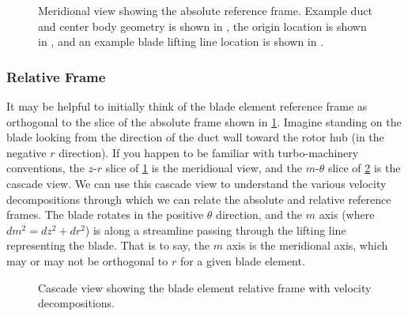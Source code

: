 %    

\begin{figure}[h!]
    \centering
   
   \caption{Meridional view showing the absolute reference frame. Example duct and center body geometry is shown in , the origin location is shown in , and an example blade lifting line location is shown in .}
    \label{fig:absolutecoordinatesystem}
\end{figure}



\subsubsection{Relative Frame}
\label{ssec:relativeframe}

It may be helpful to initially think of the blade element reference frame as orthogonal to the slice of the absolute frame shown in \cref{fig:absolutecoordinatesystem}.
%
Imagine standing on the blade looking from the direction of the duct wall toward the rotor hub (in the negative \(r\) direction).
%
If you happen to be familiar with turbo-machinery conventions, the \(z\)-\(r\) slice of \cref{fig:absolutecoordinatesystem} is the meridional view, and the \(m\)-\(\theta\) slice of \cref{fig:relativeframe} is the cascade view.
%
We can use this cascade view to understand the various velocity decompositions through which we can relate the absolute and relative reference frames.
%
The blade rotates in the positive \(\theta\) direction, and the \(m\) axis (where \(dm^2 = dz^2+dr^2\)) is along a streamline passing through the lifting line representing the blade.
%
That is to say, the \(m\) axis is the meridional axis, which may or may not be orthogonal to \(r\) for a given blade element.

\begin{figure}[h!]
    \centering
    
    \caption{Cascade view showing the blade element relative frame with velocity decompositions.}
    \label{fig:relativeframe}
\end{figure}




